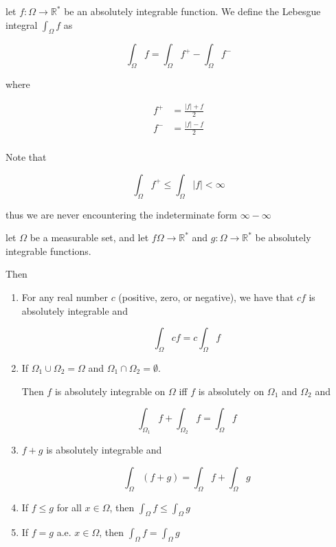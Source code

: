 \begin{definition}
    let $f: \Omega \to \mathbb{R}^*$ be an absolutely integrable  function. We define the Lebesgue integral
    $\int_{\Omega}f $ as

    \[
        \int_{\Omega}f = \int_{\Omega}f^+ - \int_{\Omega}f^-
    \]

    where

    \begin{align*}
        f^+ &= \frac{|f| + f}{2} \\
        f^- &= \frac{|f| - f}{2} \\
    \end{align*}

    Note that

    \[
\int_{\Omega}f^+ \le \int_{\Omega}|f| < \infty
    \]

    thus we are never encountering the indeterminate form $\infty - \infty$
\end{definition}

\begin{thm}
    let $\Omega$ be a measurable set, and let $f \Omega \to \mathbb{R}^*$ and $g: \Omega \to \mathbb{R}^*$ be absolutely integrable functions.

    Then

    \begin{enumerate}
        \item For any real number $c$ (positive, zero, or negative), we have that $cf$ is absolutely  integrable and

        \[
            \int_{\Omega} cf = c\int_{\Omega} f
        \]

        \item If $\Omega_1 \cup \Omega_2 = \Omega$ and $\Omega_1 \cap \Omega_2 = \emptyset$.
        
        Then $f$ is absolutely integrable on $\Omega$ iff $f$ is absolutely on $\Omega_1$ and $\Omega_2$ and

        \[
            \int_{\Omega_1}f +\int_{\Omega_2}f = \int_{\Omega}f
        \]

        \item $f+g$ is absolutely integrable and

        \[
            \int_{\Omega}(f+g) = \int_{\Omega}f +  \int_{\Omega}g
        \]

        \item If $f \le g$ for all $x \in \Omega$, then $\int_{\Omega}f \le \int_{\Omega} g$


        \item If $f = g$ a.e. $x \in \Omega$, then $\int_{\Omega}f = \int_{\Omega} g$
    \end{enumerate}
\end{thm}

